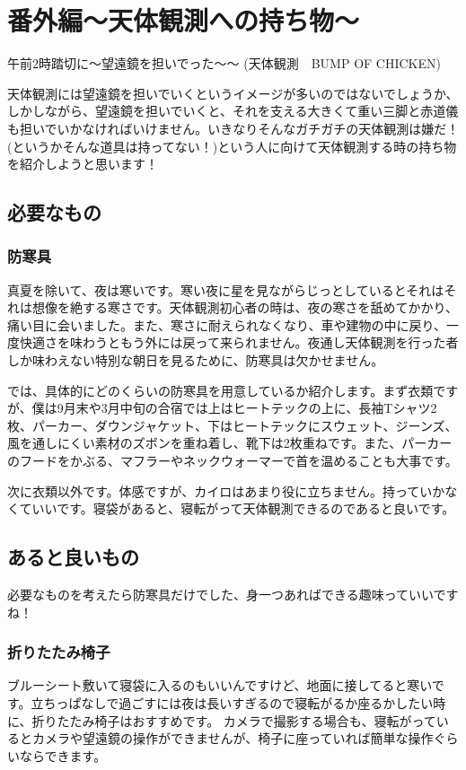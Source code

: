 \documentclass[../main]{subfiles}
\begin{document}
\section{番外編〜天体観測への持ち物〜}
午前2時踏切に〜望遠鏡を担いでった〜〜
(天体観測　BUMP OF CHICKEN)


天体観測には望遠鏡を担いでいくというイメージが多いのではないでしょうか、しかしながら、望遠鏡を担いでいくと、それを支える大きくて重い三脚と赤道儀も担いでいかなければいけません。いきなりそんなガチガチの天体観測は嫌だ！(というかそんな道具は持ってない！)という人に向けて天体観測する時の持ち物を紹介しようと思います！

\subsection{必要なもの}
\subsubsection{防寒具}
真夏を除いて、夜は寒いです。寒い夜に星を見ながらじっとしているとそれはそれは想像を絶する寒さです。天体観測初心者の時は、夜の寒さを舐めてかかり、痛い目に会いました。また、寒さに耐えられなくなり、車や建物の中に戻り、一度快適さを味わうともう外には戻って来られません。夜通し天体観測を行った者しか味わえない特別な朝日を見るために、防寒具は欠かせません。

では、具体的にどのくらいの防寒具を用意しているか紹介します。まず衣類ですが、僕は9月末や3月中旬の合宿では上はヒートテックの上に、長袖Tシャツ2枚、パーカー、ダウンジャケット、下はヒートテックにスウェット、ジーンズ、風を通しにくい素材のズボンを重ね着し、靴下は2枚重ねです。また、パーカーのフードをかぶる、マフラーやネックウォーマーで首を温めることも大事です。

次に衣類以外です。体感ですが、カイロはあまり役に立ちません。持っていかなくていいです。寝袋があると、寝転がって天体観測できるのであると良いです。

\subsection{あると良いもの}
必要なものを考えたら防寒具だけでした、身一つあればできる趣味っていいですね！

\subsubsection{折りたたみ椅子}
ブルーシート敷いて寝袋に入るのもいいんですけど、地面に接してると寒いです。立ちっぱなしで過ごすには夜は長いすぎるので寝転がるか座るかしたい時に、折りたたみ椅子はおすすめです。
カメラで撮影する場合も、寝転がっているとカメラや望遠鏡の操作ができませんが、椅子に座っていれば簡単な操作ぐらいならできます。
\end{document}
